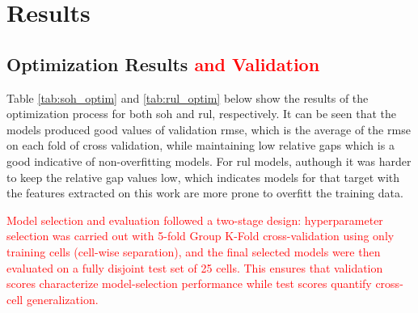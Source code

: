 \section{Results} \label{sec:results}

\subsection{Optimization Results \textcolor{red}{and Validation}}

Table \ref{tab:soh_optim} and \ref{tab:rul_optim} below show the results of the optimization process for both \acf{soh} and \acf{rul}, respectively. It can be seen that the models produced good values of validation \acf{rmse}, which is the average of the \ac{rmse} on each fold of cross validation, while maintaining low relative gaps which is a good indicative of non-overfitting models. For \ac{rul} models, authough it was harder to keep the relative gap values low, which indicates models for that target with the features extracted on this work are more prone to overfitt the training data.

\textcolor{red}{Model selection and evaluation followed a two-stage design: hyperparameter selection was carried out with 5-fold Group K-Fold cross-validation using only training cells (cell-wise separation), and the final selected models were then evaluated on a fully disjoint test set of 25 cells. This ensures that validation scores characterize model-selection performance while test scores quantify cross-cell generalization.}

